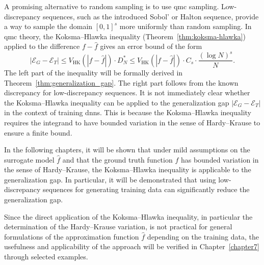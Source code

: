 A promising alternative to random sampling is to use \acf{qmc} sampling.
Low-discrepancy sequences, such as the introduced Sobol' or Halton sequence, provide
a way to sample the domain $[0,1]^s$ more uniformly than random sampling. In
\acl{qmc} theory, the Koksma--Hlawka inequality (Theorem~\ref{thm:koksma-hlawka})
applied to the difference $f-\hat{f}$ gives an error bound of the form
\begin{equation*}
|\mathcal{E}_G - \mathcal{E}_T| \leq V_{\mathrm{HK}}(|f - \hat{f}|) \cdot D^*_N \leq  V_{\mathrm{HK}}(|f - \hat{f}|) \cdot C_s \cdot \frac{(\log N)^s}{N}.
\end{equation*}
The left part of the inequality will be formally derived in
Theorem~\ref{thm:generalization_gap}. The right part follows from the known
discrepancy for low-discrepancy sequences. It is not immediately clear whether
the Koksma--Hlawka inequality can be applied to the generalization gap
$|\mathcal{E}_G - \mathcal{E}_T|$ in the context of training \acp{dnn}. This is
because the Koksma--Hlawka inequality requires the integrand to have bounded
variation in the sense of Hardy--Krause to ensure a finite bound.

In the following chapters, it will be shown that under mild assumptions on the
surrogate model $\hat{f}$ and that the ground truth function $f$ has bounded
variation in the sense of Hardy--Krause, the Koksma--Hlawka inequality is
applicable to the generalization gap. In particular, it will be demonstrated
that using low-discrepancy sequences for generating training data can
significantly reduce the generalization gap.

Since the direct application of the Koksma--Hlawka inequality, in particular the
determination of the Hardy--Krause variation, is not practical for general
formulations of the approximation function $\hat{f}$ depending on the training
data, the usefulness and applicability of the approach will be verified in
Chapter~\ref{chapter7} through selected examples.
